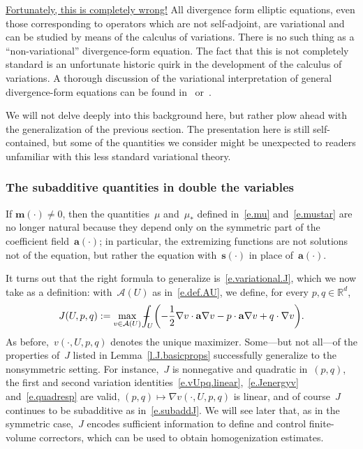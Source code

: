\documentclass[11pt]{article} %
\numberwithin{equation}{section}
\theoremstyle{definition}
\let\originalleft\left
\let\originalright\right
\renewcommand{\left}{\mathopen{}\mathclose\bgroup\originalleft}
\renewcommand{\right}{\aftergroup\egroup\originalright}
\newcommand*{\Rd}{\ensuremath{\mathbb{R}^d}}
\newcommand{\s}{\mathbf{s}}
\renewcommand{\a}{\mathbf{a}}
\newcommand{\m}{\mathbf{m}}
\def\Xint#1{\mathchoice
{\XXint\displaystyle\textstyle{#1}}%
{\XXint\textstyle\scriptstyle{#1}}%
{\XXint\scriptstyle\scriptscriptstyle{#1}}%
{\XXint\scriptscriptstyle\scriptscriptstyle{#1}}%
\!\int}
\def\XXint#1#2#3{{\setbox0=\hbox{$#1{#2#3}{\int}$}
\vcenter{\hbox{$#2#3$}}\kern-.5\wd0}}
\def\fint{\Xint-}
\newcommand{\A}{\mathcal{A}}
\begin{document}
\underline{Fortunately, this is completely wrong!} All divergence form elliptic equations, even those corresponding to operators which are  not self-adjoint, are variational and can be studied by means of the calculus of variations. 
There is no such thing as a ``non-variational'' divergence-form equation. 
The fact that this is not completely standard is an unfortunate historic quirk in the development of the calculus of variations. 
A thorough discussion of the variational interpretation of general divergence-form equations can be found in~\cite[Section 10.1]{AKMBook} or~\cite{AM}. 

\smallskip

We will not delve deeply into this background here, but rather plow ahead with the generalization of the previous section. 
The presentation here is still self-contained, but some of the quantities we consider might be unexpected to readers unfamiliar with this less standard variational theory. 

\subsubsection{The subadditive quantities in double the variables}
\label{ss.subadd.doubletrouble}

If $\m(\cdot)\neq0$, then the quantities~$\mu$ and~$\mu_*$ defined in~\eqref{e.mu} and~\eqref{e.mustar} are no longer natural because they depend only on the symmetric part of the coefficient field~$\a(\cdot)$; in particular, the extremizing functions are not solutions not of the equation, but rather the equation with~$\s(\cdot)$ in place of~$\a(\cdot)$. 

\smallskip

It turns out that the right formula to generalize is~\eqref{e.variational.J}, which we now take as a definition: with~$\A(U)$ as in~\eqref{e.def.AU}, 
we define, for every $p,q\in\Rd$, 
\begin{equation}
\label{e.variational.J.nonsymm}
J(U,p,q) 
:= 
\max_{v\in \mathcal{A}(U)} 
\fint_U \left( -\frac12 \nabla v\cdot \a\nabla v -p\cdot \a\nabla v + q\cdot \nabla v   \right).
\end{equation}
As before,~$v(\cdot,U,p,q)$ denotes the unique maximizer. 
Some---but not all---of the properties of~$J$ listed in Lemma~\ref{l.J.basicprops} successfully generalize to the nonsymmetric setting. For instance,~$J$ is nonnegative and quadratic in~$(p,q)$, the first and second variation identities~\eqref{e.vUpq.linear},~\eqref{e.Jenergyv} and~\eqref{e.quadresp} are valid, $(p,q) \mapsto \nabla v(\cdot,U,p,q)$ is linear, and of course~$J$ continues to be subadditive as in~\eqref{e.subaddJ}. We will see later that, as in the symmetric case,~$J$ encodes sufficient information to define and control finite-volume correctors, which can be used to obtain homogenization estimates.
\end{document}
